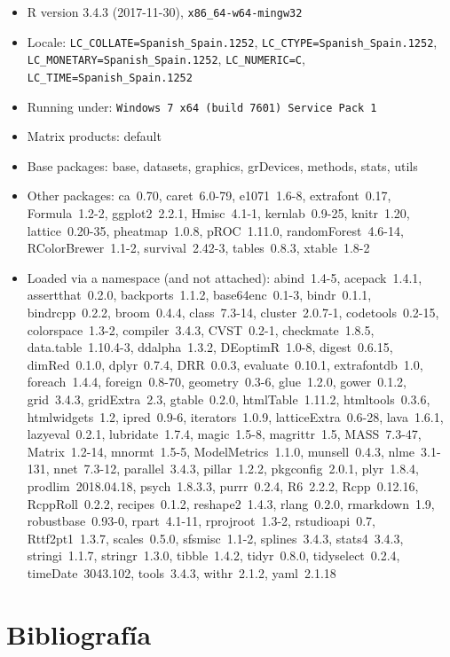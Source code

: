 \documentclass[12pt,spanish,a4paper]{article}
\numberwithin{equation}{section}
\begin{document}
\begin{itemize}\raggedright
  \item R version 3.4.3 (2017-11-30), \verb|x86_64-w64-mingw32|
  \item Locale: \verb|LC_COLLATE=Spanish_Spain.1252|, \verb|LC_CTYPE=Spanish_Spain.1252|, \verb|LC_MONETARY=Spanish_Spain.1252|, \verb|LC_NUMERIC=C|, \verb|LC_TIME=Spanish_Spain.1252|
  \item Running under: \verb|Windows 7 x64 (build 7601) Service Pack 1|
  \item Matrix products: default
  \item Base packages: base, datasets, graphics, grDevices,
    methods, stats, utils
  \item Other packages: ca~0.70, caret~6.0-79, e1071~1.6-8,
    extrafont~0.17, Formula~1.2-2, ggplot2~2.2.1, Hmisc~4.1-1,
    kernlab~0.9-25, knitr~1.20, lattice~0.20-35, pheatmap~1.0.8,
    pROC~1.11.0, randomForest~4.6-14, RColorBrewer~1.1-2,
    survival~2.42-3, tables~0.8.3, xtable~1.8-2
  \item Loaded via a namespace (and not attached): abind~1.4-5,
    acepack~1.4.1, assertthat~0.2.0, backports~1.1.2,
    base64enc~0.1-3, bindr~0.1.1, bindrcpp~0.2.2, broom~0.4.4,
    class~7.3-14, cluster~2.0.7-1, codetools~0.2-15,
    colorspace~1.3-2, compiler~3.4.3, CVST~0.2-1, checkmate~1.8.5,
    data.table~1.10.4-3, ddalpha~1.3.2, DEoptimR~1.0-8,
    digest~0.6.15, dimRed~0.1.0, dplyr~0.7.4, DRR~0.0.3,
    evaluate~0.10.1, extrafontdb~1.0, foreach~1.4.4,
    foreign~0.8-70, geometry~0.3-6, glue~1.2.0, gower~0.1.2,
    grid~3.4.3, gridExtra~2.3, gtable~0.2.0, htmlTable~1.11.2,
    htmltools~0.3.6, htmlwidgets~1.2, ipred~0.9-6,
    iterators~1.0.9, latticeExtra~0.6-28, lava~1.6.1,
    lazyeval~0.2.1, lubridate~1.7.4, magic~1.5-8, magrittr~1.5,
    MASS~7.3-47, Matrix~1.2-14, mnormt~1.5-5, ModelMetrics~1.1.0,
    munsell~0.4.3, nlme~3.1-131, nnet~7.3-12, parallel~3.4.3,
    pillar~1.2.2, pkgconfig~2.0.1, plyr~1.8.4, prodlim~2018.04.18,
    psych~1.8.3.3, purrr~0.2.4, R6~2.2.2, Rcpp~0.12.16,
    RcppRoll~0.2.2, recipes~0.1.2, reshape2~1.4.3, rlang~0.2.0,
    rmarkdown~1.9, robustbase~0.93-0, rpart~4.1-11,
    rprojroot~1.3-2, rstudioapi~0.7, Rttf2pt1~1.3.7, scales~0.5.0,
    sfsmisc~1.1-2, splines~3.4.3, stats4~3.4.3, stringi~1.1.7,
    stringr~1.3.0, tibble~1.4.2, tidyr~0.8.0, tidyselect~0.2.4,
    timeDate~3043.102, tools~3.4.3, withr~2.1.2, yaml~2.1.18
\end{itemize}

\hypertarget{bibliografia}{%
\section*{Bibliografía}\label{bibliografia}}
\end{document}
